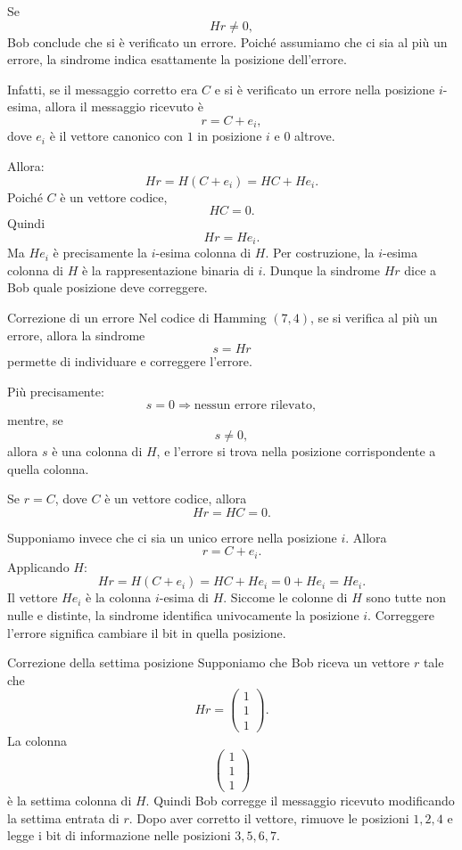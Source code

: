 \documentclass[a4paper]{article}
\begin{document}
Se
\[
    Hr\neq 0,
\]
Bob conclude che si è verificato un errore. Poiché assumiamo che ci sia al più un errore, la sindrome indica esattamente la posizione dell'errore.

Infatti, se il messaggio corretto era \(C\) e si è verificato un errore nella posizione \(i\)-esima, allora il messaggio ricevuto è
\[
    r=C+e_i,
\]
dove \(e_i\) è il vettore canonico con \(1\) in posizione \(i\) e \(0\) altrove.

Allora:
\[
    Hr
    =
    H(C+e_i)
    =
    HC+He_i.
\]
Poiché \(C\) è un vettore codice,
\[
    HC=0.
\]
Quindi
\[
    Hr=He_i.
\]
Ma \(He_i\) è precisamente la \(i\)-esima colonna di \(H\). Per costruzione, la \(i\)-esima colonna di \(H\) è la rappresentazione binaria di \(i\). Dunque la sindrome \(Hr\) dice a Bob quale posizione deve correggere.

\begin{snippetproposition}{Correzione di un errore}
    Nel codice di Hamming \((7,4)\), se si verifica al più un errore, allora la sindrome
    \[
        s=Hr
    \]
    permette di individuare e correggere l'errore.

    Più precisamente:
    \[
        s=0
        \Longrightarrow
        \text{nessun errore rilevato},
    \]
    mentre, se
    \[
        s\neq 0,
    \]
    allora \(s\) è una colonna di \(H\), e l'errore si trova nella posizione corrispondente a quella colonna.
\end{snippetproposition}

\begin{snippetproof}{}
    Se \(r=C\), dove \(C\) è un vettore codice, allora
    \[
        Hr=HC=0.
    \]

    Supponiamo invece che ci sia un unico errore nella posizione \(i\). Allora
    \[
        r=C+e_i.
    \]
    Applicando \(H\):
    \[
        Hr=H(C+e_i)=HC+He_i=0+He_i=He_i.
    \]
    Il vettore \(He_i\) è la colonna \(i\)-esima di \(H\). Siccome le colonne di \(H\) sono tutte non nulle e distinte, la sindrome identifica univocamente la posizione \(i\). Correggere l'errore significa cambiare il bit in quella posizione.
\end{snippetproof}

\begin{snippetexample}{Correzione della settima posizione}
    Supponiamo che Bob riceva un vettore \(r\) tale che
    \[
        Hr=
        \begin{pmatrix}
            1\\
            1\\
            1
        \end{pmatrix}.
    \]
    La colonna
    \[
        \begin{pmatrix}
            1\\
            1\\
            1
        \end{pmatrix}
    \]
    è la settima colonna di \(H\). Quindi Bob corregge il messaggio ricevuto modificando la settima entrata di \(r\). Dopo aver corretto il vettore, rimuove le posizioni \(1,2,4\) e legge i bit di informazione nelle posizioni \(3,5,6,7\).
\end{snippetexample}
\end{document}
